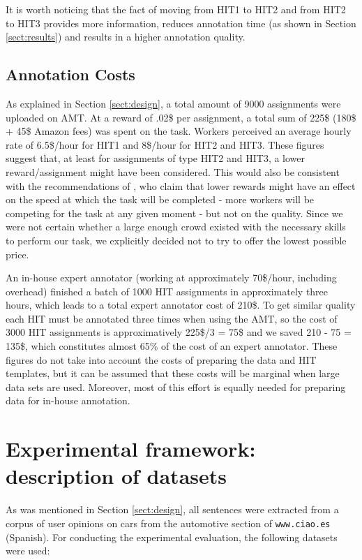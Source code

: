 \documentclass[11pt]{elsarticle}
\begin{document}
It is worth noticing that the fact of moving from HIT1 to HIT2 and from HIT2 to HIT3 provides more information, reduces annotation time (as shown in Section \ref{sect:results}) and results in a higher annotation quality.

\subsection{Annotation Costs}
\label{sect:costs}

As explained in Section \ref{sect:design}, a total amount of 9000 assignments were uploaded on AMT. At a reward of .02\$ per assignment, a total sum of 225\$ (180\$ + 45\$ Amazon fees) was spent on the task. Workers perceived an average hourly rate of 6.5\$/hour for HIT1 and 8\$/hour for HIT2 and HIT3. These figures suggest that, at least for assignments of type HIT2 and HIT3, a lower reward/assignment might have been considered. This would also be consistent with the recommendations of \cite{mason_financial_2009}, who claim that lower rewards might have an effect on the speed at which the task will be completed - more workers will be competing for the task at any given moment - but not on the quality. Since we were not certain whether a large enough crowd existed with the necessary skills to perform our task, we explicitly decided not to try to offer the lowest possible price.

An in-house expert annotator (working at approximately 70\$/hour, including overhead) finished a batch of 1000 HIT assignments in approximately three hours, which leads to a total expert annotator cost of 210\$. To get similar quality each HIT must be annotated three times when using the AMT, so the cost of 3000 HIT assignments is approximatively 225\$/3 = 75\$ and we saved 210 - 75 = 135\$, which constitutes almost 65\% of the cost of an expert annotator. These figures do not take into account the costs of preparing the data and HIT templates, but it can be assumed that these costs will be marginal when large data sets are used. Moreover, most of this effort is equally needed for preparing data for in-house annotation.

\section{Experimental framework: description of datasets}
\label{sect:datasets}

As was mentioned in Section \ref{sect:design}, all sentences were extracted from a corpus of user opinions on cars from the automotive section of \texttt{www.ciao.es} (Spanish). For conducting the experimental evaluation, the following datasets were used:
\end{document}
